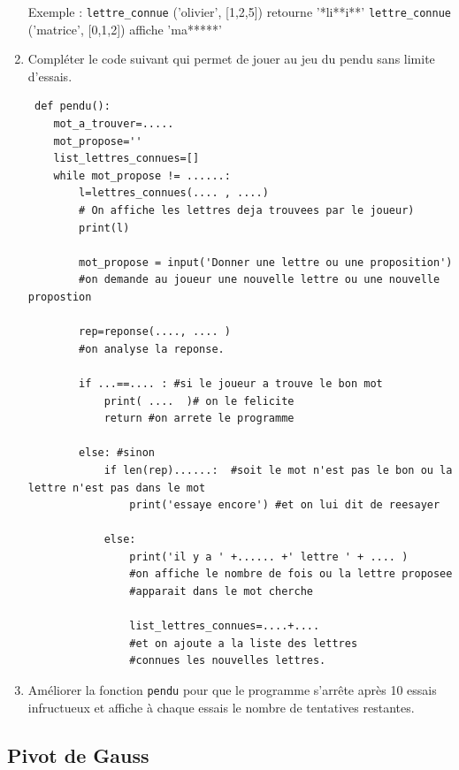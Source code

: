 \begin{exercice}
\begin{enumerate}
Exemple : \texttt{lettre\_connue} ('olivier', [1,2,5]) retourne '*li**i**' 
\texttt{lettre\_connue} ('matrice', [0,1,2]) affiche 'ma*****'
 

 \item Compléter le code suivant qui permet de jouer au jeu du pendu  sans limite d'essais. 
\newpage
 \begin{lstlisting}
 def pendu():
    mot_a_trouver=.....
    mot_propose=''
    list_lettres_connues=[]
    while mot_propose != ......:    
        l=lettres_connues(.... , ....)
        # On affiche les lettres deja trouvees par le joueur)
        print(l)

        mot_propose = input('Donner une lettre ou une proposition') 
        #on demande au joueur une nouvelle lettre ou une nouvelle propostion

        rep=reponse(...., .... ) 
        #on analyse la reponse.

        if ...==.... : #si le joueur a trouve le bon mot
            print( ....  )# on le felicite
            return #on arrete le programme

        else: #sinon
            if len(rep)......:  #soit le mot n'est pas le bon ou la lettre n'est pas dans le mot
                print('essaye encore') #et on lui dit de reesayer

            else:
                print('il y a ' +...... +' lettre ' + .... )  
                #on affiche le nombre de fois ou la lettre proposee 
                #apparait dans le mot cherche
                
                list_lettres_connues=....+.... 
                #et on ajoute a la liste des lettres 
                #connues les nouvelles lettres.

 \end{lstlisting}
 
 \item Améliorer la fonction \texttt{pendu} pour que le programme s'arrête après 10 essais infructueux et affiche à chaque essais le nombre de tentatives restantes. 


\end{enumerate}
\end{exercice}
\begin{correction}

\end{correction}


\subsection{Pivot de Gauss}



